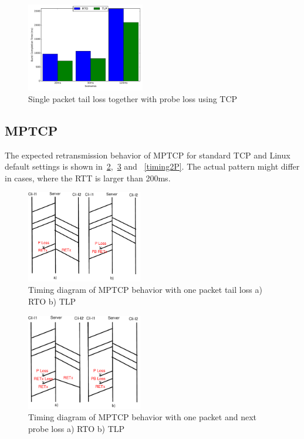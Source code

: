 \documentclass[10pt,draftcls,twocolumn]{IEEEconf}
\begin{document}
\begin{figure}[!ht]
\begin{center}
\includegraphics[angle=0, width=0.46\textwidth, natwidth=578.16,natheight=433.62]{plots/T1PP.pdf}
\caption{Single packet tail loss together with probe loss using TCP}\label{t1pp}
\end{center}
\end{figure}

\subsection{MPTCP}


The expected retransmission behavior of MPTCP for standard TCP and Linux default settings is shown 
in~\ref{timing1P},~\ref{timing1PP} and ~\ref{timing2P}. The actual pattern might differ in cases,
where the RTT is larger than 200ms. 

\begin{figure}[!ht]
\begin{center}
\includegraphics[angle=0, width=0.45\textwidth, natwidth=610, natheight=400]{images/timing1P.pdf}
\end{center}
\caption{Timing diagram of MPTCP behavior with one packet tail loss a) RTO b) TLP}\label{timing1P}
\end{figure}

\begin{figure}[!ht]
\begin{center}
\includegraphics[angle=0, width=0.45\textwidth, natwidth=610, natheight=400]{images/timing1PP.pdf}
\end{center}
\caption{Timing diagram of MPTCP behavior with one packet and next probe loss a) RTO b) TLP}\label{timing1PP}
\end{figure}
\end{document}
